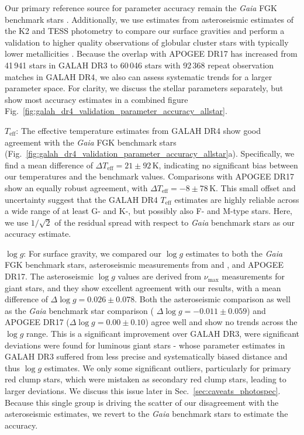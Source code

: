 \documentclass[
  journal=pasa,
  manuscript=research-paper, %
  year=2024,
  volume=37
]{cup-journal}
\newcommand{\Teff}{$T_\mathrm{eff}$\xspace}
\newcommand{\logg}{$\log g$\xspace}
\newcommand{\Gaia}{\textit{Gaia}\xspace}
\begin{document}
Our primary reference source for parameter accuracy remain the \Gaia FGK benchmark stars \citep{Jofre2014, Jofre2015, Jofre2018, Heiter2015}. Additionally, we use estimates from asteroseismic estimates of the K2 and TESS photometry \citep{Zinn2020, Hon2021} to compare our surface gravities and perform a validation to higher quality observations of globular cluster stars with typically lower metallicities \citep{Carretta2009, Carretta2009c, Johnson2010}. Because the overlap with APOGEE DR17 \citep{SDSSDR17} has increased from 41\,941 stars in GALAH DR3 to 60\,046 stars with 92\,368 repeat observation matches in GALAH DR4, we also can assess systematic trends for a larger parameter space. For clarity, we discuss the stellar parameters separately, but show most accuracy estimates in a combined figure Fig.~\ref{fig:galah_dr4_validation_parameter_accuracy_allstar}.

\Teff: The effective temperature estimates from GALAH DR4 show good agreement with the \Gaia FGK benchmark stars (Fig.~\ref{fig:galah_dr4_validation_parameter_accuracy_allstar}a). Specifically, we find a mean difference of $\Delta T_\mathrm{eff} = 21 \pm 92\,\mathrm{K}$, indicating no significant bias between our temperatures and the benchmark values. Comparisons with APOGEE DR17 show an equally robust agreement, with $\Delta T_\mathrm{eff} = -8 \pm 78\,\mathrm{K}$. This small offset and uncertainty suggest that the GALAH DR4 \Teff estimates are highly reliable across a wide range of at least G- and K-, but possibly also F- and M-type stars. Here, we use $1/\sqrt{2}$ of the residual spread with respect to \Gaia benchmark stars as our accuracy estimate.

\logg: For surface gravity, we compared our \logg estimates to both the \Gaia FGK benchmark stars, asteroseismic measurements from \citet{Zinn2020} and \citet{Hon2021}, and APOGEE DR17. The asteroseismic \logg values are derived from $\nu_\mathrm{max}$ measurements for giant stars, and they show excellent agreement with our results, with a mean difference of $\Delta \log g = 0.026 \pm 0.078$. Both the asteroseismic comparison as well as the \Gaia benchmark star comparison ( $\Delta \log g = -0.011 \pm 0.059$) and APOGEE DR17 ($\Delta \log g = 0.00 \pm 0.10$) agree well and show no trends across the \logg range. This is a significant improvement over GALAH DR3, were significant deviations were found for luminous giant stars - whose parameter estimates in GALAH DR3 suffered from less precise and systematically biased distance and thus \logg estimates. We only some significant outliers, particularly for primary red clump stars, which were mistaken as secondary red clump stars, leading to larger deviations. We discuss this issue later in Sec.~\ref{sec:caveats_photospec}. Because this single group is driving the scatter of our disagreement with the asteroseismic estimates, we revert to the \Gaia benchmark stars to estimate the accuracy.
\end{document}
